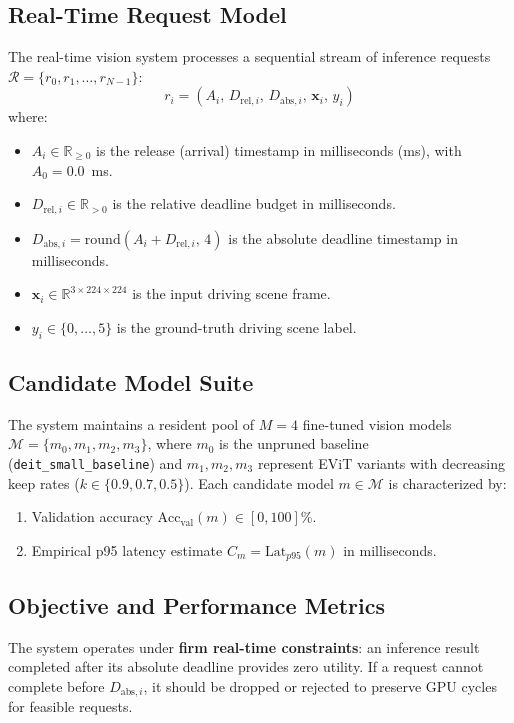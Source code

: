 \documentclass[conference]{IEEEtran}
\begin{document}
\subsection{Real-Time Request Model}
The real-time vision system processes a sequential stream of inference requests $\mathcal{R} = \{r_0, r_1, \dots, r_{N-1}\}$:
\begin{equation}
r_i = (A_i, \, D_{\text{rel}, i}, \, D_{\text{abs}, i}, \, \mathbf{x}_i, \, y_i)
\end{equation}
where:
\begin{itemize}
    \item $A_i \in \mathbb{R}_{\ge 0}$ is the release (arrival) timestamp in milliseconds (ms), with $A_0 = 0.0$~ms.
    \item $D_{\text{rel}, i} \in \mathbb{R}_{> 0}$ is the relative deadline budget in milliseconds.
    \item $D_{\text{abs}, i} = \text{round}(A_i + D_{\text{rel}, i}, \, 4)$ is the absolute deadline timestamp in milliseconds.
    \item $\mathbf{x}_i \in \mathbb{R}^{3 \times 224 \times 224}$ is the input driving scene frame.
    \item $y_i \in \{0, \dots, 5\}$ is the ground-truth driving scene label.
\end{itemize}

\subsection{Candidate Model Suite}
The system maintains a resident pool of $M=4$ fine-tuned vision models $\mathcal{M} = \{m_0, m_1, m_2, m_3\}$, where $m_0$ is the unpruned baseline (\texttt{deit\_small\_baseline}) and $m_1, m_2, m_3$ represent EViT variants with decreasing keep rates ($k \in \{0.9, 0.7, 0.5\}$). Each candidate model $m \in \mathcal{M}$ is characterized by:
\begin{enumerate}
    \item Validation accuracy $\text{Acc}_{\text{val}}(m) \in [0, 100]\%$.
    \item Empirical p95 latency estimate $C_m = \text{Lat}_{p95}(m)$ in milliseconds.
\end{enumerate}

\subsection{Objective and Performance Metrics}
The system operates under \textbf{firm real-time constraints}: an inference result completed after its absolute deadline provides zero utility. If a request cannot complete before $D_{\text{abs}, i}$, it should be dropped or rejected to preserve GPU cycles for feasible requests.
\end{document}
